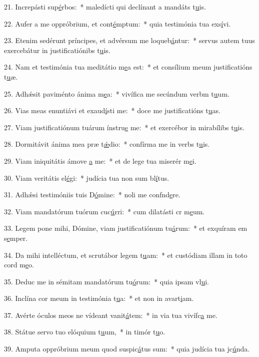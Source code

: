 21. Increpásti sup\uline{é}rbos:~* maledícti qui declínant a mandáts t\uline{u}is.\par 
22. Aufer a me oppróbrium, et cont\uline{é}mptum:~* quia testimónia tua exs\uline{í}vi.\par 
23. Etenim sedérunt príncipes, et advérsum me loqueb\uline{á}ntur:~* servus autem tuus exercebátur in justificatiónibs t\uline{u}is.\par 
24. Nam et testimónia tua meditátio m\uline{e}a est:~* et consílium meum justificatións t\uline{u}æ.\par 
25. Adhǽsit paviménto ánima m\uline{e}a:~* vivífica me secúndum verbm t\uline{u}um.\par 
26. Vias meas enuntiávi et exaud\uline{í}sti me:~* doce me justificatións t\uline{u}as.\par 
27. Viam justificatiónum tuárum ínstru\uline{e} me:~* et exercébor in mirabílibs t\uline{u}is.\par 
28. Dormitávit ánima mea præ t\uline{ǽ}dio:~* confírma me in verbs t\uline{u}is.\par 
29. Viam iniquitátis ámove \uline{a} me:~* et de lege tua miserér m\uline{e}i.\par 
30. Viam veritátis el\uline{é}gi:~* judícia tua non sum bl\uline{í}tus.\par 
31. Adhǽsi testimóniis tuis D\uline{ó}mine:~* noli me confnd\uline{e}re.\par 
32. Viam mandatórum tuórum cuc\uline{ú}rri:~* cum dilatásti cr m\uline{e}um.\par 
33. Legem pone mihi, Dómine, viam justificatiónum tu\uline{á}rum:~* et exquíram em s\uline{e}mper.\par 
34. Da mihi intelléctum, et scrutábor legem t\uline{u}am:~* et custódiam illam in toto cord m\uline{e}o.\par 
35. Deduc me in sémitam mandatórum tu\uline{ó}rum:~* quia ipsam vl\uline{u}i.\par 
36. Inclína cor meum in testimónia t\uline{u}a:~* et non in avart\uline{i}am.\par 
37. Avérte óculos meos ne vídeant vanit\uline{á}tem:~* in via tua vivífc\uline{a} me.\par 
38. Státue servo tuo elóquium t\uline{u}um,~* in timór t\uline{u}o.\par 
39. Amputa oppróbrium meum quod suspic\uline{á}tus sum:~* quia judícia tua jc\uline{ú}nda.\par 
